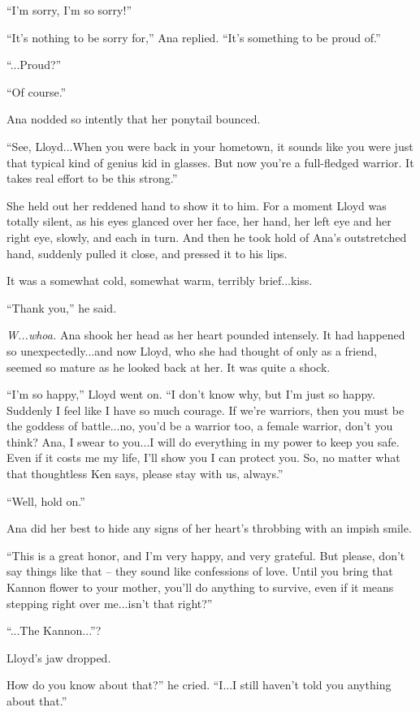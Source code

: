 \documentclass[
]{article}
\begin{document}
``I'm sorry, I'm so sorry!''

``It's nothing to be sorry for,'' Ana replied. ``It's something to be
proud of.''

``...Proud?''

``Of course.''

Ana nodded so intently that her ponytail bounced.

``See, Lloyd...When you were back in your hometown, it sounds like you
were just that typical kind of genius kid in glasses. But now you're a
full-fledged warrior. It takes real effort to be this strong.''

She held out her reddened hand to show it to him. For a moment Lloyd was
totally silent, as his eyes glanced over her face, her hand, her left
eye and her right eye, slowly, and each in turn. And then he took hold
of Ana's outstretched hand, suddenly pulled it close, and pressed it to
his lips.

It was a somewhat cold, somewhat warm, terribly brief...kiss.

``Thank you,'' he said.

\emph{W...whoa.} Ana shook her head as her heart pounded intensely. It
had happened so unexpectedly...and now Lloyd, who she had thought of
only as a friend, seemed so mature as he looked back at her. It was
quite a shock.

``I'm so happy,'' Lloyd went on. ``I don't know why, but I'm just so
happy. Suddenly I feel like I have so much courage. If we're warriors,
then you must be the goddess of battle...no, you'd be a warrior too, a
female warrior, don't you think? Ana, I swear to you...I will do
everything in my power to keep you safe. Even if it costs me my life,
I'll show you I can protect you. So, no matter what that thoughtless Ken
says, please stay with us, always.''

``Well, hold on.''

Ana did her best to hide any signs of her heart's throbbing with an
impish smile.

``This is a great honor, and I'm very happy, and very grateful. But
please, don't say things like that -- they sound like confessions of
love. Until you bring that Kannon flower to your mother, you'll do
anything to survive, even if it means stepping right over me...isn't
that right?''

``...The Kannon...''?

Lloyd's jaw dropped.

How do you know about that?'' he cried. ``I...I still haven't told you
anything about that.''
\end{document}
